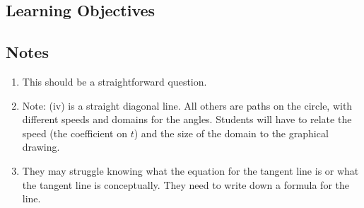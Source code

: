 \subsection*{Learning Objectives}


\subsection*{Notes}
	\begin{enumerate}
    \item This should be a straightforward question. 
    \item Note: (iv) is a straight diagonal line. All others are paths on the circle, with different speeds and domains for the angles. Students will have to relate the speed (the coefficient on $t$) and the size of the domain to the graphical drawing.
    \item They may struggle knowing what the equation for the tangent line is or what the tangent line is conceptually. They need to write down a formula for the line. 
\end{enumerate}